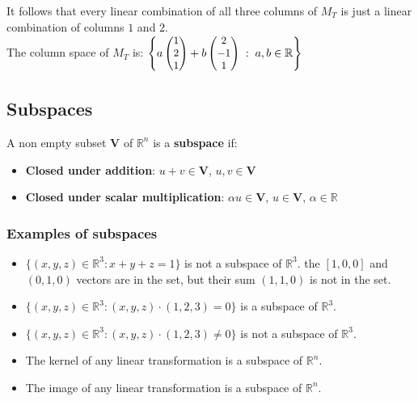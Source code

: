 \documentclass[a4paper, 9pt]{extarticle}
\begin{document}
It follows that every linear combination of all three columns of $M_T$ is just a linear combination of columns $1$ and $2$. \\
The column space of $M_T$ is:
$
  \small
  \left\{
  a\begin{pmatrix}
    1 \\
    2 \\
    1
  \end{pmatrix}
  +
  b \begin{pmatrix}
    2  \\
    -1 \\
    1
  \end{pmatrix} \; : \; a,b \in \mathbb{R}
  \right\}
$
\subsection{Subspaces}
\begin{definitionbox}{}{}
  A non empty subset $\textbf{V}$ of $\mathbb{R}^n$ is a \textbf{subspace} if:
  \begin{itemize}
    \item \textbf{Closed under addition}: $u +v \in \mathbf{V}$, $u, v \in \textbf{V}$
    \item \textbf{Closed under scalar multiplication}: $\alpha u \in \textbf{V}$, $u \in \textbf{V}$, $\alpha \in \mathbb{R}$
  \end{itemize}
\end{definitionbox}
\subsubsection*{Examples of subspaces}
\begin{itemize}
  \item $\{(x,y,z) \in \mathbb{R}^3 : x + y + z = 1\}$ is not a subspace of $\mathbb{R}^3$. the $[1,0,0]$ and $(0,1,0)$ vectors are in the set, but their sum $(1,1,0)$ is not in the set.
  \item $\{(x,y,z) \in \mathbb{R}^3 : (x,y,z) \cdot (1,2,3) = 0\}$ is a subspace of $\mathbb{R}^3$.
  \item $\{(x,y,z) \in \mathbb{R}^3 : (x,y,z) \cdot (1,2,3) \neq 0\}$ is not a subspace of $\mathbb{R}^3$.
  \item The kernel of any linear transformation is a subspace of $\mathbb{R}^n$.
  \item The image of any linear transformation is a subspace of $\mathbb{R}^n$.
\end{itemize}
\end{document}
